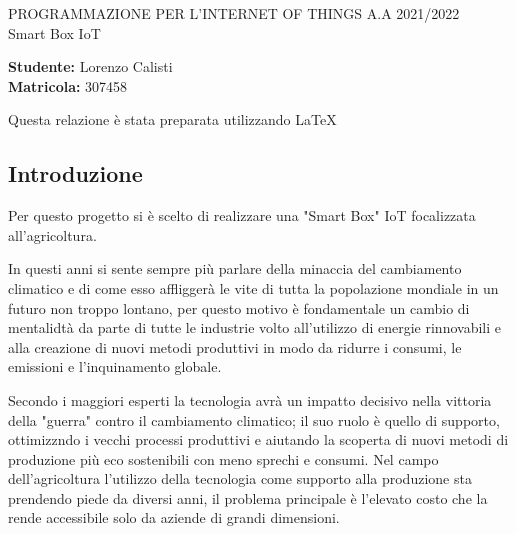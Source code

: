 \documentclass[a4paper, 12pt]{report}
\begin{document}
\begin{titlepage}
  \begin{center}
    \LARGE{PROGRAMMAZIONE PER L'INTERNET OF THINGS A.A 2021/2022} \\
    \vspace{9cm}
    \Huge{Smart Box IoT}
  \end{center}
  \vspace*{\fill}
  \begin{flushright}
    \large{\textbf{Studente:} Lorenzo Calisti} \\
    \large{\textbf{Matricola:} 307458}
  \end{flushright}
  \vspace{1cm}
  \begin{center}
Questa relazione è stata preparata utilizzando \LaTeX
  \end{center}
\end{titlepage}

\subsection*{Introduzione}
\vspace{0.5cm}

Per questo progetto si è scelto di realizzare una "Smart Box" IoT focalizzata all'agricoltura. 

In questi anni si sente sempre più parlare della minaccia del cambiamento climatico e di come esso affliggerà le vite di tutta la popolazione mondiale in un futuro non troppo lontano, per questo motivo è fondamentale 
un cambio di mentalidtà da parte di tutte le industrie volto all'utilizzo di energie rinnovabili e alla creazione di nuovi metodi produttivi in modo da ridurre i consumi, le emissioni e l'inquinamento globale.

Secondo i maggiori esperti la tecnologia avrà un impatto decisivo nella vittoria della "guerra" contro il cambiamento climatico; il suo ruolo è quello di supporto, ottimizzndo i vecchi processi produttivi
e aiutando la scoperta di nuovi metodi di produzione più eco sostenibili con meno sprechi e consumi.
Nel campo dell'agricoltura l'utilizzo della tecnologia come supporto alla produzione sta prendendo piede da diversi anni, il problema principale è l'elevato costo che la rende accessibile solo da aziende di grandi dimensioni.
\end{document}
